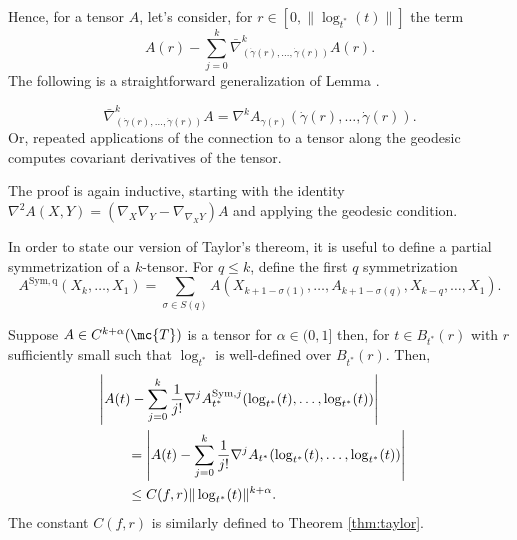 \documentclass{article}
\begin{document}
Hence, for a tensor $A$, let's consider, for $r \in [0, \|\log_{t^*}(t)\|]$ the term
$$
A(r) - \sum_{j=0}^k \bar{\nabla}^k_{(\dot{\gamma}(r), \dots, \dot{\gamma}(r))}A(r).
$$
The following is a straightforward generalization of Lemma \cite{lem:geodesic}.
\begin{lemma}
$$
\bar{\nabla}^k_{(\dot{\gamma}(r), \dots, \dot{\gamma}(r))}A= \nabla^k A_{\gamma(r)}\left(\dot{\gamma}(r), \dots, \dot{\gamma}(r)\right).
$$
Or, repeated applications of the connection to a tensor along the geodesic computes covariant derivatives of the tensor. 
\end{lemma}
The proof is again inductive, starting with the identity $\nabla^2 A(X, Y) = (\nabla_X \nabla_Y - \nabla_{\nabla_XY})A$ and applying the geodesic condition.

In order to state our version of Taylor's thereom, it is useful to define a partial symmetrization of a $k$-tensor. For $q \leq k$, define the first $q$ symmetrization
$$
A^{\mathrm{Sym,q}}(X_k,\dots, X_1) = \sum_{\sigma \in S(q)} A(X_{k+1-\sigma(1)}, \dots, A_{k+1-\sigma(q)}, X_{k-q}, \dots, X_1).
$$

\begin{theorem}
\label{thm:taylor:tensor}
  Suppose $A \in C^{k+\alpha}(\mc{T})$ is a tensor for $\alpha \in (0, 1]$ then, for $t \in B_{t^*}(r)$ with $r$ sufficiently small such that $\log_{t^*}$ is well-defined
    over $B_{t^*}(r)$. Then,
  \begin{equation}
    \label{eq:taylor:theorem}
\begin{aligned}
  \lefteqn{    \left|A(t) - \sum_{j=0}^k \frac{1}{j!} \nabla^j A^{\mathrm{Sym},j}_{t^*}(\log_{t^*}(t), \dots, \log_{t^*}(t)) \right| } \\
  & \qquad =     \left|A(t) - \sum_{j=0}^k \frac{1}{j!} \nabla^j A_{t^*}(\log_{t^*}(t), \dots, \log_{t^*}(t)) \right| \\
  & \qquad \leq C(f,r) \|\log_{t^*}(t)\|^{k+\alpha}.
\end{aligned}
    \end{equation}
The constant $C(f, r)$ is similarly defined to Theorem \ref{thm:taylor}.
  \end{theorem}

\end{document}
